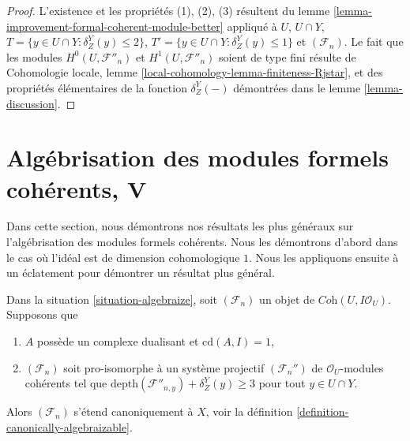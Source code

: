 \begin{proof}
L'existence et les propriétés (1), (2), (3) résultent du
lemme \ref{lemma-improvement-formal-coherent-module-better} appliqué
à $U$, $U \cap Y$, $T = \{y \in U \cap Y : \delta^Y_Z(y) \leq 2\}$,
$T' = \{y \in U \cap Y : \delta^Y_Z(y) \leq 1\}$ et $(\mathcal{F}_n)$.
Le fait que les modules $H^0(U, \mathcal{F}''_n)$ et
$H^1(U, \mathcal{F}''_n)$ soient de type fini résulte de
Cohomologie locale, lemme \ref{local-cohomology-lemma-finiteness-Rjstar},
et des propriétés élémentaires de la fonction $\delta^Y_Z(-)$
démontrées dans le lemme \ref{lemma-discussion}.
\end{proof}











\section{Algébrisation des modules formels cohérents, V}
\label{section-algebraization-modules-conclusion}

\noindent
Dans cette section, nous démontrons nos résultats les plus généraux sur l'algébrisation
des modules formels cohérents. Nous les démontrons d'abord dans le cas où
l'idéal est de dimension cohomologique $1$. Nous les appliquons ensuite
à un éclatement pour démontrer un résultat plus général.

\begin{lemma}
\label{lemma-cd-1-canonical}
Dans la situation \ref{situation-algebraize}, soit $(\mathcal{F}_n)$
un objet de $\textit{Coh}(U, I\mathcal{O}_U)$. Supposons que
\begin{enumerate}
\item $A$ possède un complexe dualisant et $\text{cd}(A, I) = 1$,
\item $(\mathcal{F}_n)$ soit pro-isomorphe à un système projectif
$(\mathcal{F}_n'')$ de $\mathcal{O}_U$-modules cohérents tel que
$\text{depth}(\mathcal{F}''_{n, y}) + \delta^Y_Z(y) \geq 3$
pour tout $y \in U \cap Y$.
\end{enumerate}
Alors $(\mathcal{F}_n)$ s'étend canoniquement à $X$, voir la
définition \ref{definition-canonically-algebraizable}.
\end{lemma}

